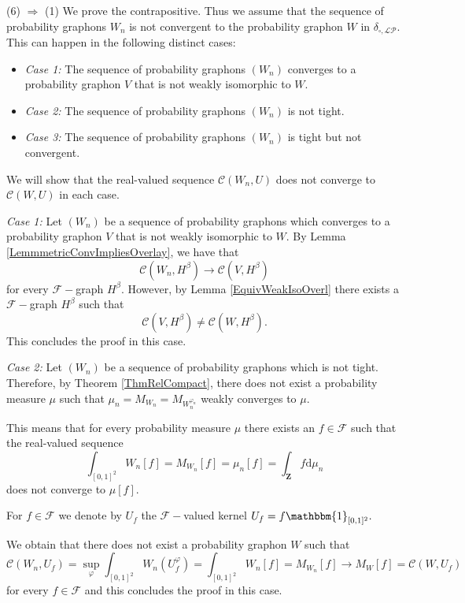 \documentclass[11pt]{article}
\newcommand{\cC}{{\mathcal C}}  %
\newcommand{\cF}{{\mathcal F}}  %
\newcommand{\Space}{\mathbf{Z}}
\begin{document}
(6) $\Rightarrow$ (1) 
We prove the contrapositive. Thus we assume that the sequence of probability graphons $W_n$ is not convergent to the probability graphon $W$ in $\delta_{\square,\mathcal{LP}}.$ This can happen in the following distinct cases:
\begin{itemize}
    \item \emph{Case 1:} The sequence of probability graphons $\left(W_n\right)$ converges to a probability graphon $V$ that is not weakly isomorphic to $W.$
    \item \emph{Case 2:} The sequence of probability graphons $\left(W_n\right)$ is not tight.
    \item \emph{Case 3:} The sequence of probability graphons $\left(W_n\right)$ is tight but not convergent.
\end{itemize}
We will show that the real-valued sequence $\cC(W_n,U)$ does not converge to $\cC(W,U)$ in each case. \newline

\emph{Case 1:} 
Let $\left(W_n\right)$ be a sequence of probability graphons which converges to a probability graphon $V$ that is not weakly isomorphic to $W.$ By Lemma \ref{LemmmetricConvImpliesOverlay}, we have that $$
\cC(W_n,H^{\beta})\rightarrow \cC(V,H^{\beta})
$$
for every $\cF-$graph $H^{\beta}.$ However, by Lemma \ref{EquivWeakIsoOverl} there exists a $\cF-$graph $H^{\beta}$ such that 
$$\cC(V,H^{\beta})\neq \cC(W,H^{\beta}).$$ This concludes the proof in this case. \newline

\emph{Case 2:}
Let $\left(W_n\right)$ be a sequence of probability graphons which is not tight. Therefore, by Theorem \ref{ThmRelCompact}, there does not exist a probability measure $\mu$ such that $\mu_n=M_{W_n}=M_{W^{\varphi_n}_n}$ weakly converges to $\mu.$ 

This means that for every probability measure $\mu$ there exists an $f\in \cF$ such that the real-valued sequence $$
\int_{[0,1]^2}W_n[f]=M_{W_n}[f]=\mu_n[f]=\int_{\Space}f\mathrm{d}\mu_n
$$
does not converge to $\mu[f].$ 

For $f\in \cF$ we denote by $U_f$ the $\cF-$valued kernel $U_f=f\mathbbm{1}_{[0,1]^2}.$

We obtain that there does not exist a probability graphon $W$ such that 
$$
\cC(W_n,U_f)=\sup_{\varphi}\int_{[0,1]^2}W_n(U_f^{\varphi})=\int_{[0,1]^2}W_n[f]=M_{W_n}[f]\rightarrow M_W[f]=\cC(W,U_f)$$
 for every $f\in \cF$ and this concludes the proof in this case. \newline
\end{document}
